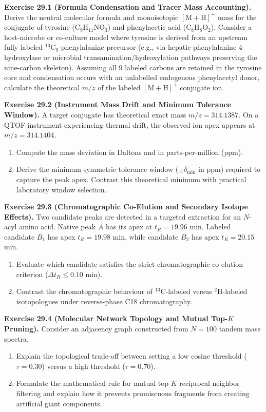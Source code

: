 \documentclass[11pt,twoside,openright]{book}
\begin{document}
\noindent\textbf{Exercise 29.1 (Formula Condensation and Tracer Mass Accounting).}\enspace
Derive the neutral molecular formula and monoisotopic $[\text{M}+\text{H}]^+$ mass for the conjugate of tyrosine ($\text{C}_9\text{H}_{11}\text{NO}_3$) and phenylacetic acid ($\text{C}_8\text{H}_8\text{O}_2$). Consider a host-microbe or co-culture model where tyrosine is derived from an upstream fully labeled $^{13}\text{C}_9$-phenylalanine precursor (e.g., via hepatic phenylalanine 4-hydroxylase or microbial transamination/hydroxylation pathways preserving the nine-carbon skeleton). Assuming all 9 labeled carbons are retained in the tyrosine core and condensation occurs with an unlabelled endogenous phenylacetyl donor, calculate the theoretical $m/z$ of the labeled $[\text{M}+\text{H}]^+$ conjugate ion.

\vspace{0.8em}
\noindent\textbf{Exercise 29.2 (Instrument Mass Drift and Minimum Tolerance Window).}\enspace
A target conjugate has theoretical exact mass $m/z = 314.1387$. On a QTOF instrument experiencing thermal drift, the observed ion apex appears at $m/z = 314.1404$.
\begin{enumerate}
    \item Compute the mass deviation in Daltons and in parts-per-million (ppm).
    \item Derive the minimum symmetric tolerance window ($\pm \delta_{\text{min}}$ in ppm) required to capture the peak apex. Contrast this theoretical minimum with practical laboratory window selection.
\end{enumerate}

\vspace{0.8em}
\noindent\textbf{Exercise 29.3 (Chromatographic Co-Elution and Secondary Isotope Effects).}\enspace
Two candidate peaks are detected in a targeted extraction for an $N$-acyl amino acid. Native peak $A$ has its apex at $t_R = 19.96$ min. Labeled candidate $B_1$ has apex $t_R = 19.98$ min, while candidate $B_2$ has apex $t_R = 20.15$ min.
\begin{enumerate}
    \item Evaluate which candidate satisfies the strict chromatographic co-elution criterion ($\Delta t_R \le 0.10$ min).
    \item Contrast the chromatographic behaviour of $^{13}\text{C}$-labeled versus $^{2}\text{H}$-labeled isotopologues under reverse-phase C18 chromatography.
\end{enumerate}

\vspace{0.8em}
\noindent\textbf{Exercise 29.4 (Molecular Network Topology and Mutual Top-$K$ Pruning).}\enspace
Consider an adjacency graph constructed from $N = 100$ tandem mass spectra.
\begin{enumerate}
    \item Explain the topological trade-off between setting a low cosine threshold ($\tau = 0.30$) versus a high threshold ($\tau = 0.70$).
    \item Formulate the mathematical rule for mutual top-$K$ reciprocal neighbor filtering and explain how it prevents promiscuous fragments from creating artificial giant components.
\end{enumerate}
\end{document}
